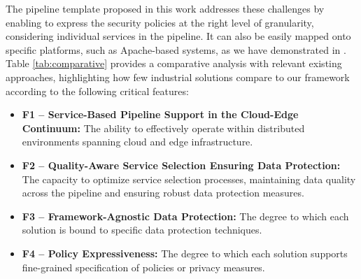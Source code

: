 {\color{OurColor}The pipeline template proposed in this work addresses these challenges by enabling to express the security policies at the right level of granularity, considering individual services in the pipeline. It can also be easily mapped onto specific platforms, such as Apache-based systems, as we have demonstrated in \cite{medes2021}.
Table \ref{tab:comparative} provides a comparative analysis with relevant existing approaches, highlighting how few industrial solutions compare to our framework according to the following critical features:
\begin{itemize}
    \item \textbf{F1 -- Service-Based Pipeline Support in the Cloud-Edge Continuum:} The ability to effectively operate within distributed environments spanning cloud and edge infrastructure.
    \item \textbf{F2 -- Quality-Aware Service Selection Ensuring Data Protection:} The capacity to optimize service selection processes, maintaining data quality across the pipeline and ensuring robust data protection measures.
    \item \textbf{F3 -- Framework-Agnostic Data Protection:} The degree to which each solution is bound to specific data protection techniques.
    \item \textbf{F4 -- Policy Expressiveness:} The degree to which each solution supports fine-grained specification of policies or privacy measures.
\end{itemize}

\begin{table}[t!]
    \centering

    \renewcommand{\arraystretch}{1.5}
\end{table}}
